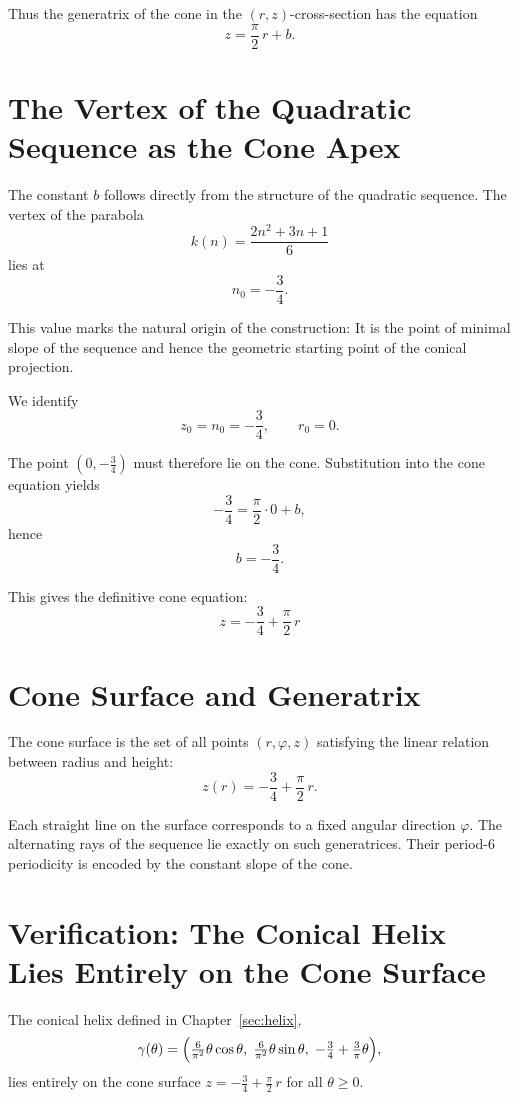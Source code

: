 Thus the generatrix of the cone in the $(r,z)$-cross-section has the equation
\[
z = \frac{\pi}{2}\,r + b.
\]

\section{The Vertex of the Quadratic Sequence as the Cone Apex}

The constant $b$ follows directly from the structure of the quadratic sequence.
The vertex of the parabola
\[
k(n) = \frac{2n^2 + 3n + 1}{6}
\]
lies at
\[
n_0 = -\frac{3}{4}.
\]

This value marks the natural origin of the construction: It is the
point of minimal slope of the sequence and hence the geometric starting point of the
conical projection.

We identify
\[
z_0 = n_0 = -\frac{3}{4}, \qquad r_0 = 0.
\]

The point $(0,-\tfrac{3}{4})$ must therefore lie on the cone. Substitution into the
cone equation yields
\[
-\frac{3}{4} = \frac{\pi}{2}\cdot 0 + b,
\]
hence
\[
b = -\frac{3}{4}.
\]

This gives the definitive cone equation:
\[
\boxed{
z = -\frac{3}{4} + \frac{\pi}{2}\,r
}
\]

\section{Cone Surface and Generatrix}

The cone surface is the set of all points $(r,\varphi,z)$ satisfying the linear
relation between radius and height:
\[
z(r) = -\frac{3}{4} + \frac{\pi}{2}\,r.
\]

Each straight line on the surface corresponds to a fixed angular direction $\varphi$.
The alternating rays of the sequence lie exactly on such generatrices.
Their period-6 periodicity is encoded by the constant slope of the cone.

\section{Verification: The Conical Helix Lies Entirely on the Cone Surface}

\begin{theorem}
\label{satz:helixaufkegel}
The conical helix defined in Chapter~\ref{sec:helix},
\[
\gamma(\theta)
= \Bigl(\tfrac{6}{\pi^2}\theta\cos\theta,\;
        \tfrac{6}{\pi^2}\theta\sin\theta,\;
        -\tfrac{3}{4}+\tfrac{3}{\pi}\theta\Bigr),
\]
lies entirely on the cone surface
$z = -\tfrac{3}{4} + \tfrac{\pi}{2}\,r$ for all $\theta \geq 0$.
\end{theorem}

